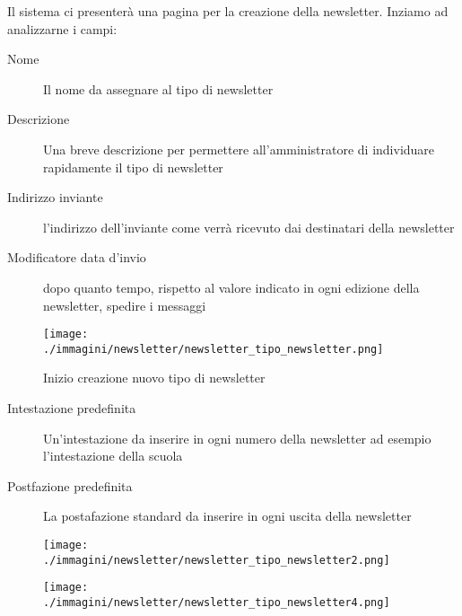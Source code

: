 Il sistema ci presenterà una pagina per la creazione della newsletter. Inziamo ad analizzarne i campi:
\begin{description}
 \item[Nome] Il nome da assegnare al tipo di newsletter
\item[Descrizione] Una breve descrizione per permettere all'amministratore di individuare rapidamente il tipo di newsletter
\item[Indirizzo inviante] l'indirizzo dell'inviante come verrà ricevuto dai destinatari della newsletter
\item[Modificatore data d'invio] dopo quanto tempo, rispetto al valore indicato in ogni edizione della newsletter, spedire i messaggi
\end{description}



\begin{figure}[H]
 \centering
 \texttt{[image: ./immagini/newsletter/newsletter\_tipo\_newsletter.png]}
\caption{Inizio creazione nuovo tipo di newsletter}
 \label{fig:newsletter_type1}
\end{figure}

\begin{description}
 \item[Intestazione predefinita]Un'intestazione da inserire in ogni numero della newsletter ad esempio l'intestazione della scuola
\item[Postfazione predefinita]La postafazione standard da inserire in ogni uscita della newsletter
\end{description}



\begin{figure}[H]
 \centering
 \texttt{[image: ./immagini/newsletter/newsletter\_tipo\_newsletter2.png]}
 \label{fig:newsletter_type2}
\end{figure}





\begin{figure}[H]
 \centering
 \texttt{[image: ./immagini/newsletter/newsletter\_tipo\_newsletter4.png]}
 \label{fig:newsletter_type3}
\end{figure}

